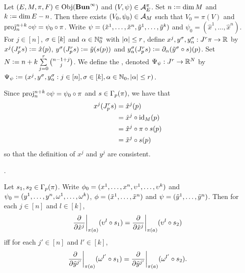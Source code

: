 \documentclass{book}
\begin{document}
\begin{defn}
	Let $(E, M, \pi, F) \in \operatorname{Obj}(\operatorname*{\text{\textbf{Bun}}^{\infty}})$ and $(V, \psi) \in \mathcal{A}_E^{\pi}$. Set $n \vcentcolon= \dim M$ and $k \vcentcolon= \dim E - n$. Then there exists $(V_0, \psi_0) \in \mathcal{A}_M$ such that $V_0 = \pi(V)$ and $\operatorname{\text{proj}}^{n+k}_{n} \circ \psi = \psi_0 \circ \pi$. Write $\psi = (\tilde{x}^1, \ldots, \tilde{x}^n, \tilde{y}^1, \ldots, \tilde{y}^k)$ and $\psi_0 = (\hat{x}^1, \ldots, \hat{x}^n)$. For $j \in [n]$, $\sigma \in [k]$ and $\alpha \in \mathbb{N}_0^{n}$ with $|\alpha| \leq r$, define $x^j, y^{\sigma}, y^{\sigma}_{\alpha}: J^r \pi \rightarrow \mathbb{R}$ by $x^j(J^r_p s) \vcentcolon= \hat{x}(p)$, $y^{\sigma}(J^r_p s) \vcentcolon= \tilde{y}(s(p))$ and $y^{\sigma}_{\alpha}(J^r_p s) \vcentcolon= \partial_{\alpha} (\tilde{y}^{\sigma} \circ s) (p)$. Set $N \vcentcolon= n  + k \sum\limits_{j=0}^r {n-1 + j \choose j} $. We define the , denoted $\Psi_{\psi}: J^r \rightarrow \mathbb{R}^{N}$ by $\Psi_{\psi} \vcentcolon= (x^j, y^{\sigma}, y^{\sigma}_{\alpha}: j \in [n], \sigma \in [k], \alpha \in \mathbb{N}_0, |\alpha| \leq r)$.
\end{defn}

\begin{note}
	Since $\operatorname{\text{proj}}^{n+k}_{n} \circ \psi = \psi_0 \circ \pi$ and $s \in \Gamma_p(\pi)$, we have that 
	\begin{align*}
		x^j(J^r_p s)
		& = \hat{x}^j(p) \\
		& = \hat{x}^j \circ \operatorname{id}_M (p) \\
		& = \hat{x}^j \circ \pi \circ s (p) \\
		& = \tilde{x}^j \circ s (p)
	\end{align*}
	so that the definition of $x^j$ and $y^j$ are consistent.
\end{note}


\begin{ex}
	.
\end{ex}


























\newpage

\begin{ex}
	Let $s_1, s_2 \in \Gamma_p(\pi)$. Write $\phi_0 = (x^1, \ldots, x^n, \upsilon^1, \ldots, \upsilon^k)$ and $\psi_0 = (y^1, \ldots, y^n, \omega^1, \ldots, \omega^k)$, $\phi = (\tilde{x}^1, \ldots, \tilde{x}^n)$ and $\psi = (\tilde{y}^1, \ldots, \tilde{y}^n)$. Then for each $j \in [n]$ and $l \in [k]$, 
	$$\frac{\partial}{\partial \tilde{x}^j} \bigg|_{\pi(a)} ( \upsilon^l \circ s_1 ) = \frac{\partial}{\partial \tilde{x}^j} \bigg|_{\pi(a)} ( \upsilon^l \circ s_2 ) $$
	iff for each $j' \in [n]$ and $l' \in [k]$, 
	$$\frac{\partial}{\partial \tilde{y}^{j'}} \bigg|_{\pi(a)} ( \omega^{l'} \circ s_1 ) = \frac{\partial}{\partial \tilde{y}^{j'}} \bigg|_{\pi(a)} ( \omega^{l'} \circ s_2 ).$$
\end{ex}
\end{document}
